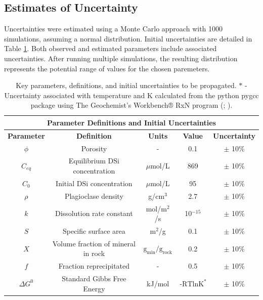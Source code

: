 \FloatBarrier

\newpage

\subsection{Estimates of Uncertainty}

Uncertainties were estimated using a Monte Carlo approach with 1000 simulations, assuming a normal distribution. Initial uncertainties are detailed in Table \ref{tab:montecarlo}. Both observed and estimated parameters include associated uncertainties. After running multiple simulations, the resulting distribution represents the potential range of values for the chosen paremeters.

\begin{table}[H]
    \centering
    \renewcommand{\arraystretch}{1.3} %
    {\small
    \begin{tabular}{|c|c|c|c|c|}
        \hline
        \multicolumn{5}{|c|}{\textbf{Parameter Definitions and Initial Uncertainties}} \\  
        \hline
        \textbf{Parameter} & \textbf{Definition} & \textbf{Units} & \textbf{Value} & \textbf{Uncertainty} \\  
        \hline
        $\phi$ & Porosity & - & 0.1 & $\pm$ 10\% \\  
        $C_{eq}$ & Equilibrium DSi concentration & $\mu$mol/L & 869 & $\pm$ 10\% \\  
        $C_0$ & Initial DSi concentration & $\mu$mol/L & 95 & $\pm$ 10\% \\  
        $\rho$ & Plagioclase density & g/cm$^3$ & 2.7 & $\pm$ 10\% \\  
        $k$ & Dissolution rate constant & mol/m$^2$/s & 10$^{-15}$ & $\pm$ 10\% \\  
        $S$ & Specific surface area & m$^2$/g & 0.1 & $\pm$ 10\% \\  
        $X$ & Volume fraction of mineral in rock & $\text{g}_{\text{min}}/\text{g}_{\text{rock}}$ & 0.2 & $\pm$ 10\% \\   
        $f$ & Fraction reprecipitated & - & 0.5 & $\pm$ 10\% \\
        $\Delta G^0$ & Standard Gibbs Free Energy & kJ/mol & $\text{-RTlnK}^*$ & $\pm$ 10\% \\
        \hline
    \end{tabular}}
    \caption{Key parameters, definitions, and initial uncertainties to be propagated. $*$ - Uncertainty associated with temperature and K calculated from the python pygcc package using The Geochemist's Workbench® RxN program (\cite{bethkeGEOCHEMICALBIOGEOCHEMICALREACTION}; \cite{awolayoPyGeochemCalcPython2022}).}
    \label{tab:montecarlo}
\end{table}

